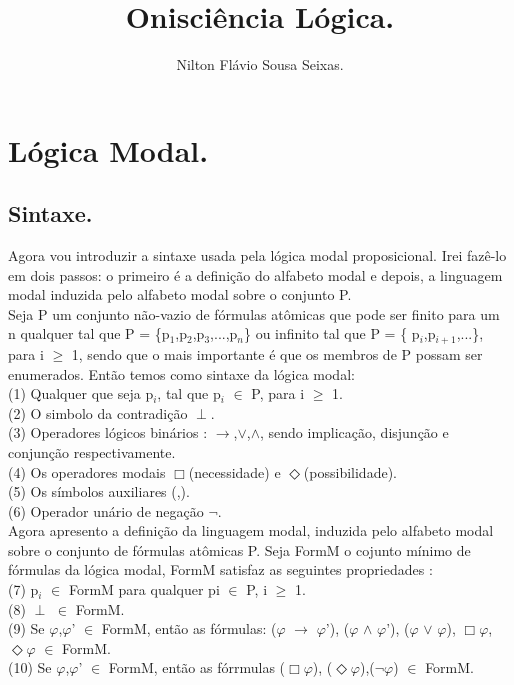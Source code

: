 \documentclass[12pt]{report}
\title{Onisciência Lógica.}
\author{Nilton Flávio Sousa Seixas.}
\begin{document}
\maketitle
\tableofcontents
\chapter{Lógica Modal.}
\section{Sintaxe.}
    \hspace{0.5cm} Agora vou introduzir a sintaxe usada pela lógica modal proposicional. Irei fazê-lo em dois passos: o primeiro é a definição do alfabeto modal e depois, a linguagem modal induzida pelo alfabeto modal sobre o conjunto P.\\
              \indent Seja P um conjunto não-vazio de fórmulas atômicas que pode ser  finito para um n qualquer tal que P = \{p$_{1}$,p$_{2}$,p$_{3}$,...,p$_{n}$\} ou infinito tal que P = \{ p$_{i}$,p$_{i+1}$,...\}, para i $\geq$ 1, sendo que o mais importante é que os membros de P possam ser enumerados. Então temos como sintaxe da lógica modal:\\
\indent (1) Qualquer que seja p$_{i}$, tal que p$_{i}$ $\in$ P, para  i $\geq$ 1.\\
\indent (2) O simbolo da contradição $\perp$.\\
\indent (3) Operadores lógicos binários : $\rightarrow$,$\vee$,$\land$, sendo implicação, disjunção e conjunção respectivamente.\\
\indent (4) Os operadores modais $\Box$(necessidade) e $\Diamond$(possibilidade).\\
\indent (5) Os símbolos auxiliares (,).\\
\indent (6) Operador unário de negação $\neg$.\\
             \indent Agora apresento a definição da linguagem modal, induzida pelo alfabeto modal sobre o conjunto de fórmulas atômicas P. Seja FormM o cojunto mínimo de fórmulas da lógica modal, FormM satisfaz as seguintes propriedades : \\
\indent (7) p$_{i}$ $\in$ FormM para qualquer pi $\in$ P,  i $\geq$ 1.\\
\indent (8) $\perp$ $\in$ FormM.\\
\indent (9) Se $\varphi$,$\varphi$' $\in$ FormM, então as fórmulas: ($\varphi$ $\rightarrow$ $\varphi$'), ($\varphi$ $\land$ $\varphi$'), ($\varphi$ $\vee$ $\varphi$), $\Box$$\varphi$, $\Diamond$$\varphi$ $\in$ FormM.\\
\indent (10) Se $\varphi$,$\varphi$' $\in$ FormM, então as fórrmulas ($\Box$$\varphi$), ($\Diamond$$\varphi$),($\neg \varphi$) $\in$ FormM.\\
\end{document}
